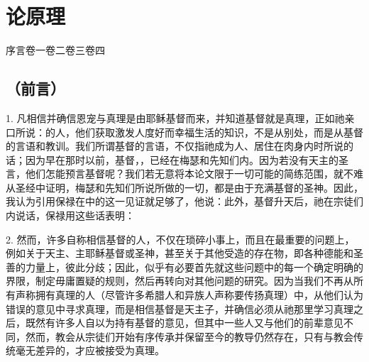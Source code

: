 
\chapter{论原理}


序言\newline{}卷一\newline{}卷二\newline{}卷三\newline{}卷四\par



\section{（前言）}


1. 凡相信并确信恩宠与真理是由耶稣基督而来，并知道基督就是真理，正如祂亲口所说：的人，他们获取激发人度好而幸福生活的知识，不是从别处，而是从基督的言语和教训。我们所谓基督的言语，不仅指祂成为人、居住在肉身内时所说的话；因为早在那时以前，基督，，已经在梅瑟和先知们内。因为若没有天主的圣言，他们怎能预言基督呢？我们若无意将本论文限于一切可能的简练范围，就不难从圣经中证明，梅瑟和先知们所说所做的一切，都是由于充满基督的圣神。因此，我认为引用保禄在中的这一见证就足够了，他说：此外，基督升天后，祂在宗徒们内说话，保禄用这些话表明：\par

2. 然而，许多自称相信基督的人，不仅在琐碎小事上，而且在最重要的问题上，例如关于天主、主耶稣基督或圣神，甚至关于其他受造的存在物，即各种德能和圣善的力量上，彼此分歧；因此，似乎有必要首先就这些问题中的每一个确定明确的界限，制定毋庸置疑的规则，然后再转向对其他问题的研究。因为当我们不再从所有声称拥有真理的人（尽管许多希腊人和异族人声称要传扬真理）中，从他们认为错误的意见中寻求真理，而是相信基督是天主子，并确信必须从祂那里学习真理之后，既然有许多人自以为持有基督的意见，但其中一些人又与他们的前辈意见不同，然而，教会从宗徒们开始有序传承并保留至今的教导仍然存在，只有与教会传统毫无差异的，才应被接受为真理。\par

